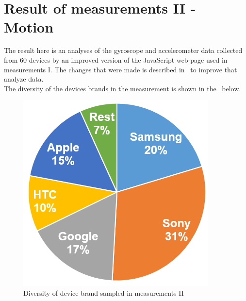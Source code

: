 \section{Result of measurements II  - Motion}\label{res:testII}
The result here is an analyses of the gyroscope and accelerometer data collected from 60 devices by an improved version of the JavaScript web-page used in measurements I. The changes that were made is described in~ to improve that analyze data. \\
The diversity of the devices brands in the measurement is shown in the~ below.
\begin{figure}[H]
	\centering
	\includegraphics[scale=.4]{img/measure2-brands}
	\caption{Diversity of device brand sampled in measurements II}
	\label{fig:brandII}
\end{figure}

